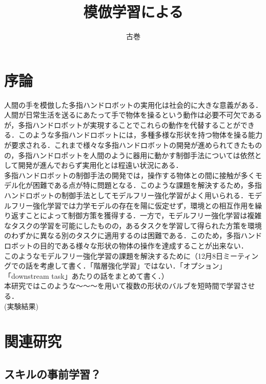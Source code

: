 \documentclass[dvipdfmx]{ampbt_nomag}
\title{模倣学習による
}     %
      {修士論文生成手法の検討}                             %
      {}                                             %
\author{古巻}{鉄平}             %
\begin{document}
\ifoutputbody
\makeinsidecover                %
\makeabstract                   %
\maketoc                        %
\setcounter{page}{1}            %
\section{序論}\label{sec-intro}		%
人間の手を模倣した多指ハンドロボットの実用化は社会的に大きな意義がある．人間が日常生活を送るにあたって手で物体を操るという動作は必要不可欠であるが，多指ハンドロボットが実現することでこれらの動作を代替することができる．このような多指ハンドロボットには，多種多様な形状を持つ物体を操る能力が要求される．これまで様々な多指ハンドロボットの開発が進められてきたものの，多指ハンドロボットを人間のように器用に動かす制御手法については依然として開発が進んでおらず実用化とは程遠い状況にある．\\
多指ハンドロボットの制御手法の開発では，操作する物体との間に接触が多くモデル化が困難である点が特に問題となる．このような課題を解決するため，多指ハンドロボットの制御手法としてモデルフリー強化学習がよく用いられる．モデルフリー強化学習では力学モデルの存在を陽に仮定せず，環境との相互作用を繰り返すことによって制御方策を獲得する\cite{RLBook}．一方で，モデルフリー強化学習は複雑なタスクの学習を可能にしたものの，あるタスクを学習して得られた方策を環境のわずかに異なる別のタスクに適用するのは困難である\cite{hua2021learning}．このため，多指ハンドロボットの目的である様々な形状の物体の操作を達成することが出来ない．\\
このようなモデルフリー強化学習の課題を解決するために（12月8日ミーティングでの話を考慮して書く．「階層強化学習」ではない．「オプション」「downstream task」あたりの話をまとめて書く．）
\\
本研究ではこのような〜〜〜を用いて複数の形状のバルブを短時間で学習させる．\\
(実験結果)\\


\section{関連研究}\label{sec-related_papers}
\subsection{スキルの事前学習？}
\end{document}
